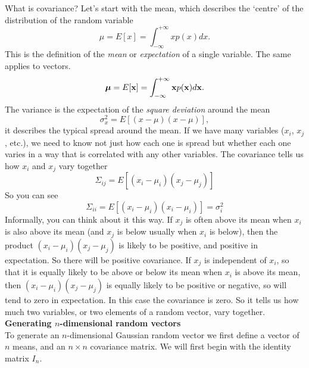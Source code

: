 \documentclass[a4paper,11pt]{article}\usepackage[]{graphicx}\usepackage[]{color}
\def\bmu{{\mbox{\boldmath $\mu$}}}
\begin{document}
What is covariance? Let's start with the mean, which describes the `centre' of the distribution of the random variable
\begin{equation}
  \mu = E[x] = \int_{-\infty}^{+\infty} x p(x) dx.
\end{equation}
This is the definition of the \emph{mean} or \emph{expectation} of a single variable. The same applies to vectors.
\begin{equation}
  \bmu = E[\mathbf{x}] = \int_{-\infty}^{+\infty} \mathbf{x} p(\mathbf{x}) d\mathbf{x}.
\end{equation}
The variance is the expectation of the \emph{square deviation} around the mean
\begin{equation}
  \sigma_x^2 = E[(x-\mu)(x-\mu)],
\end{equation}
it describes the typical spread around the mean. If we have many variables ($x_i$, $x_j$, etc.), we need to know not just how each one is spread but whether each one varies in a way that is correlated with any other variables. The covariance tells us how $x_i$ and $x_j$ vary together
\begin{equation}
  \Sigma_{ij} = E[(x_i-\mu_i)(x_j-\mu_j)]
\end{equation}
So you can see
\begin{equation}
  \Sigma_{ii} = E[(x_i-\mu_i)(x_i-\mu_i)] = \sigma_{i}^2
\end{equation}
Informally, you can think about it this way. If $x_j$ is often above its mean when $x_i$ is also above its mean (and $x_j$ is below usually when $x_i$ is below), then the product $(x_i-\mu_i)(x_j-\mu_j)$ is likely to be positive, and positive in expectation. So there will be positive covariance. If $x_j$ is independent of $x_i$, so that it is equally likely to be above or below its mean when $x_i$ is above its mean, then $(x_i-\mu_i)(x_j-\mu_j)$ is equally likely to be positive or negative, so will tend to zero in expectation. In this case the covariance is zero. So it tells us how much two variables, or two elements of a random vector, vary together.\\

\vspace{0.4cm}
\textbf{Generating $n$-dimensional random vectors}\\

To generate an $n$-dimensional Gaussian random vector we first define a vector of $n$ means, and an $n \times n$ covariance matrix. We will first begin with the identity matrix $I_n$.
\end{document}
